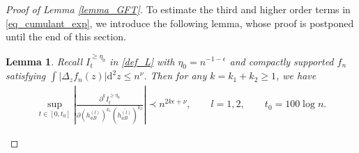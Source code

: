 \documentclass[10pt,reqno]{amsart}
\newcommand{\II}{I^{\geq \eta_0}} %
\newcommand{\dd}{\mathrm{d}}
\newcommand{\ii}{\mathrm{i}}
\newcommand{\<}{\langle}
\renewcommand{\>}{\rangle}
\numberwithin{equation}{section}
\newtheorem{lemma}[theorem]{Lemma}%
\begin{document}
\begin{proof}[Proof of Lemma \ref{lemma_GFT}]
To estimate the third and higher order terms in \eqref{eq_cumulant_exp}, we introduce the following lemma, whose proof is postponed until the end of this section.
\begin{lemma}\label{lemma_diff}
Recall $\II_t$ in \eqref{def_L} with $\eta_0=n^{-1-\epsilon}$ and compactly supported $f_n$ satisfying $\int |\Delta_z f_n (z)| \dd^2 z \leq n^{\nu}$. Then
for any $k=k_1+k_2\geq 1$, we have
\begin{align}\label{eq_bound_k}
	\sup_{t\in[0,t_0]} \left|  \frac{\partial^k \II_t }{\partial (h^{(l)}_{aB})^{k_1} (\overline{h^{(l)}_{aB}})^{k_2}} \right| \prec n^{2k\epsilon+\nu}, \qquad l=1,2, \qquad t_0=100 \log n.
\end{align}
\end{lemma}








\end{proof}
\end{document}

